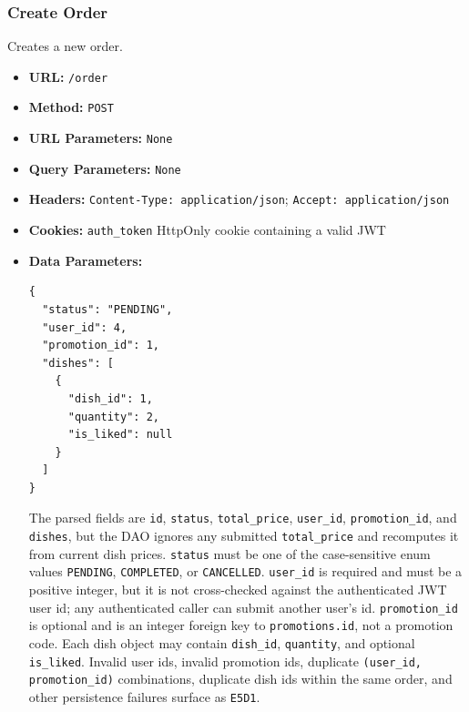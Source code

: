 \subsubsection*{Create Order}

Creates a new order.

\begin{itemize}[nosep]
\item \textbf{URL:} \texttt{/order}

\item \textbf{Method:} \texttt{POST}

\item \textbf{URL Parameters:} \texttt{None}

\item \textbf{Query Parameters:} \texttt{None}

\item \textbf{Headers:} \texttt{Content-Type: application/json}; \texttt{Accept: application/json}

\item \textbf{Cookies:} \texttt{auth\_token} HttpOnly cookie containing a valid JWT

\item \textbf{Data Parameters:}

\begin{lstlisting}
{
  "status": "PENDING",
  "user_id": 4,
  "promotion_id": 1,
  "dishes": [
    {
      "dish_id": 1,
      "quantity": 2,
      "is_liked": null
    }
  ]
}
\end{lstlisting}

The parsed fields are \texttt{id}, \texttt{status}, \texttt{total\_price}, \texttt{user\_id}, \texttt{promotion\_id}, and \texttt{dishes}, but the DAO ignores any submitted \texttt{total\_price} and recomputes it from current dish prices. \texttt{status} must be one of the case-sensitive enum values \texttt{PENDING}, \texttt{COMPLETED}, or \texttt{CANCELLED}. \texttt{user\_id} is required and must be a positive integer, but it is not cross-checked against the authenticated JWT user id; any authenticated caller can submit another user's id. \texttt{promotion\_id} is optional and is an integer foreign key to \texttt{promotions.id}, not a promotion code. Each dish object may contain \texttt{dish\_id}, \texttt{quantity}, and optional \texttt{is\_liked}. Invalid user ids, invalid promotion ids, duplicate \texttt{(user\_id, promotion\_id)} combinations, duplicate dish ids within the same order, and other persistence failures surface as \texttt{E5D1}.


\end{itemize}
